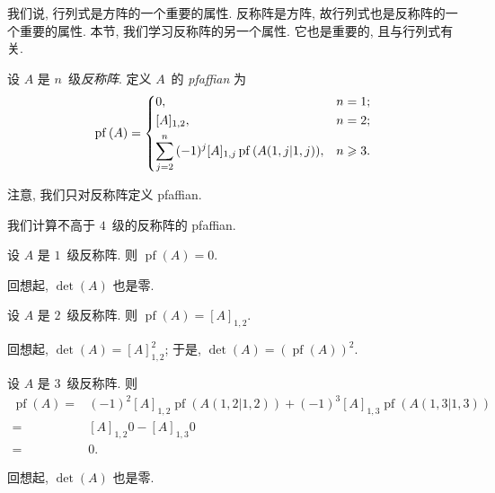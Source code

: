 我们说, 行列式是方阵的一个重要的属性.
反称阵是方阵, 故行列式也是反称阵的一个重要的属性.
本节, 我们学习反称阵的另一个属性.
它也是重要的, 且与行列式有关.

\begin{definition}[pfaffian]
    设 \(A\) 是 \(n\)~级\emph{反称阵}.
    定义 \(A\)~的 \emph{pfaffian} 为
    \begin{align*}
        \operatorname{pf} {(A)} =
        \begin{dcases}
            0,
             & n = 1;    \\
            [A]_{1,2},
             & n = 2;    \\
            \sum_{j = 2}^{n}
            {(-1)^{j} [A]_{1,j}
            \operatorname{pf} {(A({1,j}|{1,j}))}},
             & n \geq 3.
        \end{dcases}
    \end{align*}
\end{definition}


注意, 我们只对反称阵定义 pfaffian.

我们计算不高于 \(4\)~级的反称阵的 pfaffian.

\begin{example}
    设 \(A\) 是 \(1\)~级反称阵.
    则 \(\operatorname{pf} {(A)} = 0\).

    回想起, \(\det {(A)}\) 也是零.
\end{example}

\begin{example}
    设 \(A\) 是 \(2\)~级反称阵.
    则 \(\operatorname{pf} {(A)} = [A]_{1,2}\).

    回想起, \(\det {(A)} = [A]_{1,2}^2\);
    于是, \(\det {(A)} = (\operatorname{pf} {(A)})^2\).
\end{example}

\begin{example}
    设 \(A\) 是 \(3\)~级反称阵.
    则
    \begin{align*}
        \operatorname{pf} {(A)}
        = {} &
        (-1)^2 [A]_{1,2} \operatorname{pf} {(A({1,2}|{1,2}))}
        +
        (-1)^3 [A]_{1,3} \operatorname{pf} {(A({1,3}|{1,3}))}
        \\
        = {} &
        [A]_{1,2} 0 - [A]_{1,3} 0
        \\
        = {} &
        0.
    \end{align*}

    回想起, \(\det {(A)}\) 也是零.
\end{example}

